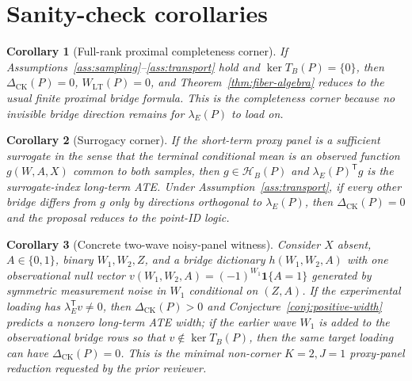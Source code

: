 \documentclass[11pt]{article}
\newcommand{\one}{\mathbf{1}}
\newcommand{\transpose}{\mathsf{T}}
\newcommand{\calH}{\mathcal{H}}
\theoremstyle{definition}
\theoremstyle{plain}
\newtheorem{corollary}{Corollary}
\theoremstyle{remark}
\begin{document}
\section{Sanity-check corollaries}
\begin{corollary}[Full-rank proximal completeness corner]\label{cor:full-rank}
If Assumptions~\ref{ass:sampling}--\ref{ass:transport} hold and
\(\ker T_B(P)=\{0\}\), then \(\Delta_{\mathrm{CK}}(P)=0\),
\(W_{\mathrm{LT}}(P)=0\), and Theorem~\ref{thm:fiber-algebra} reduces to the
usual finite proximal bridge formula.  This is the
\citet{MiaoGengTchetgen2018} completeness corner because no invisible bridge
direction remains for \(\lambda_E(P)\) to load on.
\end{corollary}

\begin{corollary}[Surrogacy corner]\label{cor:surrogacy}
If the short-term proxy panel is a sufficient surrogate in the sense that the
terminal conditional mean is an observed function \(g(W,A,X)\) common to both
samples, then \(g\in\calH_B(P)\) and \(\lambda_E(P)^\transpose g\) is the
surrogate-index long-term ATE.  Under Assumption~\ref{ass:transport}, if every
other bridge differs from \(g\) only by directions orthogonal to
\(\lambda_E(P)\), then \(\Delta_{\mathrm{CK}}(P)=0\) and the proposal reduces
to the \citet{AtheyChettyImbensKang2019} point-ID logic.
\end{corollary}

\begin{corollary}[Concrete two-wave noisy-panel witness]\label{cor:witness}
Consider \(X\) absent, \(A\in\{0,1\}\), binary \(W_1,W_2,Z\), and a bridge
dictionary \(h(W_1,W_2,A)\) with one observational null vector
\(v(W_1,W_2,A)=(-1)^{W_1}\one\{A=1\}\) generated by symmetric measurement
noise in \(W_1\) conditional on \((Z,A)\).  If the experimental loading has
\(\lambda_E^\transpose v\ne0\), then
\(\Delta_{\mathrm{CK}}(P)>0\) and Conjecture~\ref{conj:positive-width}
predicts a nonzero long-term ATE width; if the earlier wave \(W_1\) is added
to the observational bridge rows so that \(v\notin\ker T_B(P)\), then the
same target loading can have \(\Delta_{\mathrm{CK}}(P)=0\).  This is the
minimal non-corner \(K=2,J=1\) proxy-panel reduction requested by the prior
reviewer.
\end{corollary}
\end{document}
